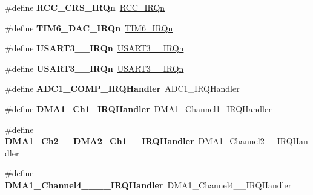 \begin{DoxyCompactItemize}
\#define {\bfseries R\+C\+C\+\_\+\+C\+R\+S\+\_\+\+I\+R\+Qn}~\hyperlink{group___peripheral__interrupt__number__definition_gga7e1129cd8a196f4284d41db3e82ad5c8a5710b22392997bac63daa5c999730f77}{R\+C\+C\+\_\+\+I\+R\+Qn}
\item 
\mbox{\label{group__stm32f030xc_gad95202b3f62989995dea3404eefece19}} 
\#define {\bfseries T\+I\+M6\+\_\+\+D\+A\+C\+\_\+\+I\+R\+Qn}~\hyperlink{group___peripheral__interrupt__number__definition_gga7e1129cd8a196f4284d41db3e82ad5c8a99bd6662671832371d7c727046b147b2}{T\+I\+M6\+\_\+\+I\+R\+Qn}
\item 
\mbox{\label{group__stm32f030xc_gaa62c02a3a748c5f16316e6fd940e3038}} 
\#define {\bfseries U\+S\+A\+R\+T3\+\_\+\_\+\+I\+R\+Qn}~\hyperlink{group___peripheral__interrupt__number__definition_gga7e1129cd8a196f4284d41db3e82ad5c8aefb58d4402655762b89163f5fa03d707}{U\+S\+A\+R\+T3\+\_\+\_\+\+I\+R\+Qn}
\item 
\mbox{\label{group__stm32f030xc_gad8e0c20d4c7a475d383e6b992ec23332}} 
\#define {\bfseries U\+S\+A\+R\+T3\+\_\+\_\+\+I\+R\+Qn}~\hyperlink{group___peripheral__interrupt__number__definition_gga7e1129cd8a196f4284d41db3e82ad5c8aefb58d4402655762b89163f5fa03d707}{U\+S\+A\+R\+T3\+\_\+\_\+\+I\+R\+Qn}
\item 
\mbox{\label{group__stm32f030xc_gaeb3545df015f964b68346cda78f7cea5}} 
\#define {\bfseries A\+D\+C1\+\_\+\+C\+O\+M\+P\+\_\+\+I\+R\+Q\+Handler}~A\+D\+C1\+\_\+\+I\+R\+Q\+Handler
\item 
\mbox{\label{group__stm32f030xc_ga3f7debe9fc2548ab6640825967110101}} 
\#define {\bfseries D\+M\+A1\+\_\+\+Ch1\+\_\+\+I\+R\+Q\+Handler}~D\+M\+A1\+\_\+\+Channel1\+\_\+\+I\+R\+Q\+Handler
\item 
\mbox{\label{group__stm32f030xc_ga3752ab0b9a6635ccd7bc87b99ee8fd9b}} 
\#define {\bfseries D\+M\+A1\+\_\+\+Ch2\+\_\+\_\+\+D\+M\+A2\+\_\+\+Ch1\+\_\+\_\+\+I\+R\+Q\+Handler}~D\+M\+A1\+\_\+\+Channel2\+\_\+\_\+\+I\+R\+Q\+Handler
\item 
\mbox{\label{group__stm32f030xc_gae3db46ad17e9f800e0f88b489eed522d}} 
\#define {\bfseries D\+M\+A1\+\_\+\+Channel4\+\_\+\_\+\_\+\_\+\+I\+R\+Q\+Handler}~D\+M\+A1\+\_\+\+Channel4\+\_\+\_\+\+I\+R\+Q\+Handler

\end{DoxyCompactItemize}
